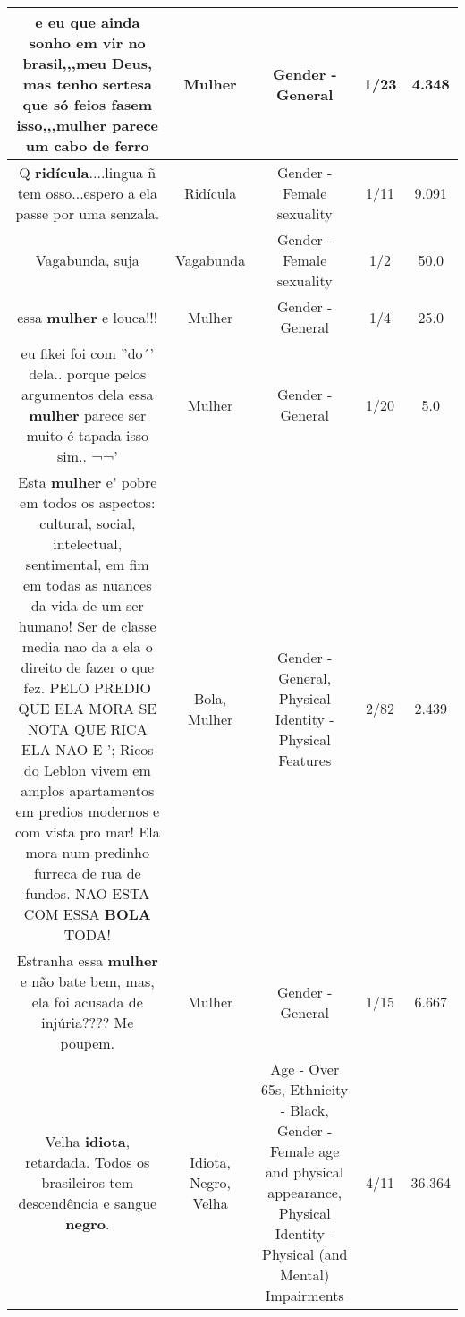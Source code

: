 \documentclass[11pt]{article}
\newlength\mylength
\begin{document}
\begin{center}
\begin{longtable}{|C{.65\mylength}|C{.30\mylength}|C{.12\mylength}|C{.12\mylength}|C{.12\mylength}|}
  \small e eu que ainda sonho em vir no brasil,,,meu Deus, mas tenho sertesa que só feios fasem isso,,,\textbf{mulher} parece um cabo de ferro\normalsize   & Mulher & Gender - General & 1/23 & 4.348 \\  \hline
  \small Q \textbf{ridícula}....lingua ñ tem osso...espero a ela passe por uma senzala.\normalsize   & Ridícula & Gender - Female sexuality & 1/11 & 9.091 \\  \hline
  \small Vagabunda, suja\normalsize   & Vagabunda & Gender - Female sexuality & 1/2 & 50.0 \\  \hline
  \small essa \textbf{mulher} e louca!!!\normalsize   & Mulher & Gender - General & 1/4 & 25.0 \\  \hline
  \small eu fikei foi com ''do´' dela..  porque pelos argumentos dela essa \textbf{mulher} parece ser muito é tapada isso sim..  ¬¬'\normalsize   & Mulher & Gender - General & 1/20 & 5.0 \\  \hline
  \small Esta \textbf{mulher} e' pobre em todos os aspectos: cultural, social, intelectual, sentimental, em fim em todas as nuances da vida de um ser humano! Ser de classe media nao da a ela o direito de fazer o que fez. PELO PREDIO QUE ELA MORA SE NOTA QUE RICA ELA NAO E '; Ricos do Leblon vivem em amplos apartamentos em predios modernos e com vista pro mar! Ela mora num predinho furreca de rua de fundos. NAO ESTA COM ESSA \textbf{BOLA} TODA!\normalsize   & Bola, Mulher & Gender - General, Physical Identity - Physical Features & 2/82 & 2.439 \\  \hline
  \small Estranha essa \textbf{mulher} e não bate bem, mas, ela foi acusada de injúria???? Me poupem.\normalsize   & Mulher & Gender - General & 1/15 & 6.667 \\  \hline
  \small Velha \textbf{idiota}, retardada. Todos os brasileiros tem descendência e sangue \textbf{negro}.\normalsize   & Idiota, Negro, Velha & Age - Over 65s, Ethnicity - Black, Gender - Female age and physical appearance, Physical Identity - Physical (and Mental) Impairments & 4/11 & 36.364 \\  \hline

\end{longtable}
\end{center}
\end{document}
